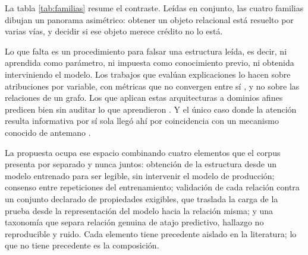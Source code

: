 La tabla \ref{tab:familias} resume el contraste. Leídas en conjunto, las cuatro familias dibujan un panorama asimétrico: obtener un objeto relacional está resuelto por varias vías, y decidir si ese objeto merece crédito no lo está.

Lo que falta es un procedimiento para falsar una estructura leída, es decir, ni aprendida como parámetro, ni impuesta como conocimiento previo, ni obtenida interviniendo el modelo. Los trabajos que evalúan explicaciones lo hacen sobre atribuciones por variable, con métricas que no convergen entre sí \cite{vitexplain2024evaluation, medtext2026attribution}, y no sobre las relaciones de un grafo. Los que aplican estas arquitecturas a dominios afines predicen bien sin auditar lo que aprendieron \cite{convlstmgcn2026vegetation, spatiotemporal2024e2e}. Y el único caso donde la atención resulta informativa por sí sola llegó ahí por coincidencia con un mecanismo conocido de antemano \cite{rotorcraft2026vortexring}.

La propuesta ocupa ese espacio combinando cuatro elementos que el corpus presenta por separado y nunca juntos: obtención de la estructura desde un modelo entrenado para ser legible, sin intervenir el modelo de producción; consenso entre repeticiones del entrenamiento; validación de cada relación contra un conjunto declarado de propiedades exigibles, que traslada la carga de la prueba desde la representación del modelo hacia la relación misma; y una taxonomía que separa relación genuina de atajo predictivo, hallazgo no reproducible y ruido. Cada elemento tiene precedente aislado en la literatura; lo que no tiene precedente es la composición.

